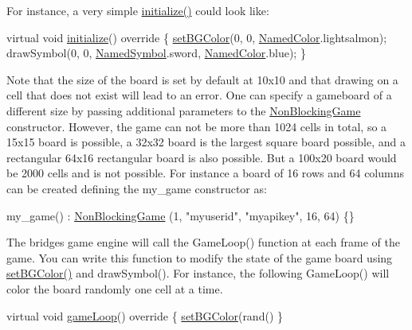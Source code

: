 For instance, a very simple \hyperlink{classbridges_1_1game_1_1_game_base_a9b6eb6fa7fceaac09d204b549164037f}{initialize()} could look like\+: 
\begin{DoxyCode}
\textcolor{keyword}{virtual} \textcolor{keywordtype}{void} \hyperlink{classbridges_1_1game_1_1_game_base_a9b6eb6fa7fceaac09d204b549164037f}{initialize}()\textcolor{keyword}{ override }\{
  \hyperlink{classbridges_1_1game_1_1_game_base_ab667bbca1c81e5fb3aa8d81d70fe8cd2}{setBGColor}(0, 0, \hyperlink{namespacebridges_1_1game_afaa832a4322b25b6a4ebfba832f10f26}{NamedColor}.lightsalmon);
  drawSymbol(0, 0, \hyperlink{namespacebridges_1_1game_ab9a19c7ab6e2ebac2f95180e21733487}{NamedSymbol}.sword, \hyperlink{namespacebridges_1_1game_afaa832a4322b25b6a4ebfba832f10f26}{NamedColor}.blue);
\}
\end{DoxyCode}


Note that the size of the board is set by default at 10x10 and that drawing on a cell that does not exist will lead to an error. One can specify a gameboard of a different size by passing additional parameters to the \hyperlink{classbridges_1_1game_1_1_non_blocking_game}{Non\+Blocking\+Game} constructor. However, the game can not be more than 1024 cells in total, so a 15x15 board is possible, a 32x32 board is the largest square board possible, and a rectangular 64x16 rectangular board is also possible. But a 100x20 board would be 2000 cells and is not possible. For instance a board of 16 rows and 64 columns can be created defining the my\+\_\+game constructor as\+:


\begin{DoxyCode}
my\_game() : \hyperlink{classbridges_1_1game_1_1_non_blocking_game_a3226aa7e7ff129e916f4bd5aabcb2e72}{NonBlockingGame} (1, \textcolor{stringliteral}{"myuserid"},  \textcolor{stringliteral}{"myapikey"}, 16, 64) \{\}
\end{DoxyCode}


The bridges game engine will call the Game\+Loop() function at each frame of the game. You can write this function to modify the state of the game board using \hyperlink{classbridges_1_1game_1_1_game_base_ab667bbca1c81e5fb3aa8d81d70fe8cd2}{set\+B\+G\+Color()} and draw\+Symbol(). For instance, the following Game\+Loop() will color the board randomly one cell at a time.


\begin{DoxyCode}
\textcolor{keyword}{virtual} \textcolor{keywordtype}{void} \hyperlink{classbridges_1_1game_1_1_game_base_a16fb787bc65be1a582cddcfba3a0c5bb}{gameLoop}()\textcolor{keyword}{ override }\{
  \hyperlink{classbridges_1_1game_1_1_game_base_ab667bbca1c81e5fb3aa8d81d70fe8cd2}{setBGColor}(rand()%
\}
\end{DoxyCode}


